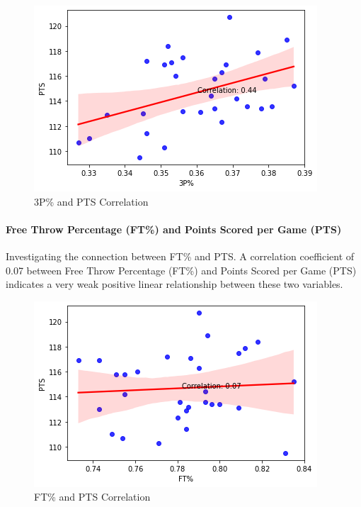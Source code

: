 \documentclass[conference]{IEEEtran}
\begin{document}
\begin{figure}[h]
    \centering
    \includegraphics[scale=0.6]{3P-PTS-COR.png}
    \caption{3P\% and PTS Correlation}
    \label{fig:enter-label}
\end{figure}
\vspace{\baselineskip}\vspace{\baselineskip}
\paragraph {Free Throw Percentage (FT\%) and Points Scored per Game (PTS)}
Investigating the connection between FT\% and PTS. A correlation coefficient of 0.07 between Free Throw Percentage (FT\%) and Points Scored per Game (PTS) indicates a very weak positive linear relationship between these two variables.

\begin{figure}[h]
    \centering
    \includegraphics[scale=0.6]{FT-PTS-COR.png}
    \caption{FT\% and PTS Correlation}
    \label{fig:enter-label}
\end{figure}
\vspace{\baselineskip}
\vspace{\baselineskip}
\vspace{\baselineskip}
\vspace{\baselineskip}
\end{document}
